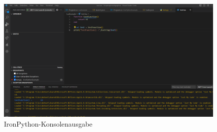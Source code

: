 \begin{itemize}
    \begin{figure}[H]
        \centering
        \includegraphics[scale=0.35]{pics/IronPythonKonsolenausgabe.png}
        \caption{IronPython-Konsolenausgabe}
        \label{fig:impl:IronPythonKonsolenausgabe}
    \end{figure}
\end{itemize}